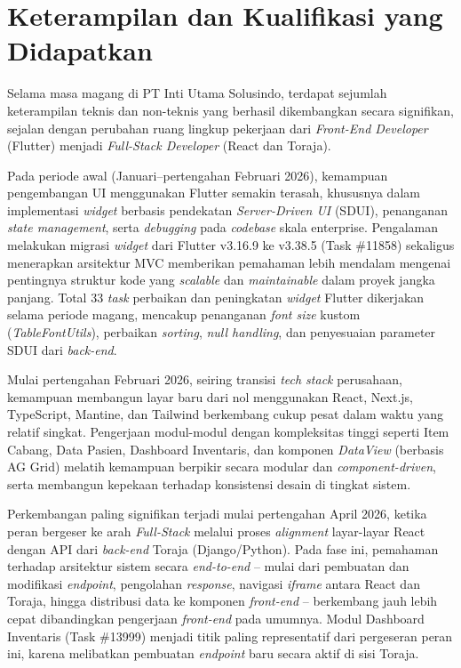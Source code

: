 \section{Keterampilan dan Kualifikasi yang Didapatkan}

Selama masa magang di PT Inti Utama Solusindo, terdapat sejumlah keterampilan
teknis dan non-teknis yang berhasil dikembangkan secara signifikan, sejalan
dengan perubahan ruang lingkup pekerjaan dari \textit{Front-End Developer}
(Flutter) menjadi \textit{Full-Stack Developer} (React dan Toraja).

Pada periode awal (Januari--pertengahan Februari 2026), kemampuan pengembangan
UI menggunakan Flutter semakin terasah, khususnya dalam implementasi
\textit{widget} berbasis pendekatan \textit{Server-Driven UI} (SDUI),
penanganan \textit{state management}, serta \textit{debugging} pada
\textit{codebase} skala enterprise. Pengalaman melakukan migrasi
\textit{widget} dari Flutter v3.16.9 ke v3.38.5 (Task \#11858) sekaligus
menerapkan arsitektur MVC memberikan pemahaman lebih mendalam mengenai
pentingnya struktur kode yang \textit{scalable} dan \textit{maintainable} dalam
proyek jangka panjang. Total 33 \textit{task} perbaikan dan peningkatan
\textit{widget} Flutter dikerjakan selama periode magang, mencakup penanganan
\textit{font size} kustom (\textit{TableFontUtils}), perbaikan
\textit{sorting}, \textit{null handling}, dan penyesuaian parameter SDUI dari
\textit{back-end}.

Mulai pertengahan Februari 2026, seiring transisi \textit{tech stack}
perusahaan, kemampuan membangun layar baru dari nol menggunakan React, Next.js,
TypeScript, Mantine, dan Tailwind berkembang cukup pesat dalam waktu yang
relatif singkat. Pengerjaan modul-modul dengan kompleksitas tinggi seperti Item
Cabang, Data Pasien, Dashboard Inventaris, dan komponen \textit{DataView}
(berbasis AG Grid) melatih kemampuan berpikir secara modular dan
\textit{component-driven}, serta membangun kepekaan terhadap konsistensi desain
di tingkat sistem.

Perkembangan paling signifikan terjadi mulai pertengahan April 2026, ketika
peran bergeser ke arah \textit{Full-Stack} melalui proses \textit{alignment}
layar-layar React dengan API dari \textit{back-end} Toraja (Django/Python).
Pada fase ini, pemahaman terhadap arsitektur sistem secara \textit{end-to-end}
-- mulai dari pembuatan dan modifikasi \textit{endpoint}, pengolahan
\textit{response}, navigasi \textit{iframe} antara React dan Toraja, hingga
distribusi data ke komponen \textit{front-end} -- berkembang jauh lebih cepat
dibandingkan pengerjaan \textit{front-end} pada umumnya. Modul Dashboard
Inventaris (Task \#13999) menjadi titik paling representatif dari pergeseran
peran ini, karena melibatkan pembuatan \textit{endpoint} baru secara aktif di
sisi Toraja.

